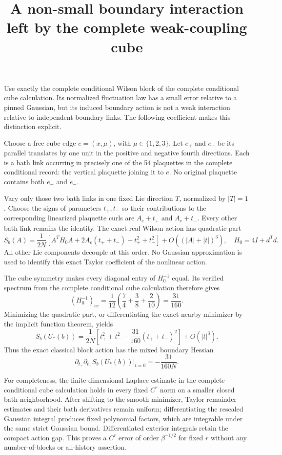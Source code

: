 \documentclass{article}
\title{A non-small boundary interaction left by the complete weak-coupling cube}\author{}\date{}
\begin{document}
\maketitle
Use exactly the complete conditional Wilson block of the complete conditional cube calculation. Its normalized fluctuation law has a small error relative to a pinned Gaussian, but its induced boundary action is not a weak interaction relative to independent boundary links. The following coefficient makes this distinction explicit.

Choose a free cube edge $e=(x,\mu)$, with $\mu\in\{1,2,3\}$. Let $e_+$ and $e_-$ be its parallel translates by one unit in the positive and negative fourth directions. Each is a bath link occurring in precisely one of the 54 plaquettes in the complete conditional record: the vertical plaquette joining it to $e$. No original plaquette contains both $e_+$ and $e_-$.

Vary only those two bath links in one fixed Lie direction $T$, normalized by $|T|=1$. Choose the signs of parameters $t_+,t_-$ so their contributions to the corresponding linearized plaquette curls are $A_e+t_+$ and $A_e+t_-$. Every other bath link remains the identity. The exact real Wilson action has quadratic part
\[
 S_b(A)=\frac1{2N}\left[
 A^TH_0A+2A_e(t_++t_-)+t_+^2+t_-^2
 \right]+O((|A|+|t|)^3),\quad H_0=4I+d^Td.
 \tag{1}
\]
All other Lie components decouple at this order. No Gaussian approximation is used to identify this exact Taylor coefficient of the nonlinear action.

The cube symmetry makes every diagonal entry of $H_0^{-1}$ equal. Its verified spectrum from the complete conditional cube calculation therefore gives
\[
 (H_0^{-1})_{ee}=\frac1{12}\left(\frac74+\frac38+\frac2{10}\right)=\frac{31}{160}.
 \tag{2}
\]
Minimizing the quadratic part, or differentiating the exact nearby minimizer by the implicit function theorem, yields
\[
 S_b(U_*(b))=\frac1{2N}\left[
 t_+^2+t_-^2-\frac{31}{160}(t_++t_-)^2
 \right]+O(|t|^3).
 \tag{3}
\]
Thus the exact classical block action has the mixed boundary Hessian
\[
 \partial_{t_+}\partial_{t_-}S_b(U_*(b))\big|_{t=0}
 =-\frac{31}{160N}.
 \tag{4}
\]

For completeness, the finite-dimensional Laplace estimate in the complete conditional cube calculation holds in every fixed $C^r$ norm on a smaller closed bath neighborhood. After shifting to the smooth minimizer, Taylor remainder estimates and their bath derivatives remain uniform; differentiating the rescaled Gaussian integral produces fixed polynomial factors, which are integrable under the same strict Gaussian bound. Differentiated exterior integrals retain the compact action gap. This proves a $C^r$ error of order $\beta^{-1/2}$ for fixed $r$ without any number-of-blocks or all-history assertion.
\end{document}
